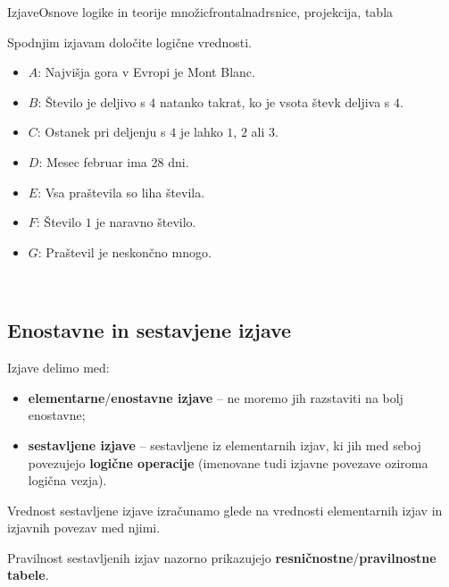 \begin{priprava}{1}{}{Izjave}{Osnove logike in teorije množic}{frontalna}{drsnice, projekcija, tabla}
 \begin{naloga}
    Spodnjim izjavam določite logične vrednosti.
    \begin{itemize}   
        \item $A$: Najvišja gora v Evropi je Mont Blanc.
        \item $B$: Število je deljivo s $4$ natanko takrat, ko je vsota števk deljiva s $4$.
        \item $C$: Ostanek pri deljenju s $4$ je lahko $1$, $2$ ali $3$.
        \item $D$: Mesec februar ima 28 dni.
        \item $E$: Vsa praštevila so liha števila.
        \item $F$: Število $1$ je naravno število.
        \item $G$: Praštevil je neskončno mnogo.
    \end{itemize}
\end{naloga}

~


  \subsection{Enostavne in sestavjene izjave}
    
    Izjave delimo med:
    \begin{itemize}
        \item \textbf{elementarne}/\textbf{enostavne izjave} -- ne moremo 
            jih razstaviti na bolj enostavne;
        \item \textbf{sestavljene izjave} -- sestavljene iz elementarnih izjav, 
            ki jih med seboj povezujejo \textbf{logične operacije} (imenovane 
            tudi izjavne povezave oziroma~ logična vezja).
    \end{itemize}
 

   
    Vrednost sestavljene izjave izračunamo glede na vrednosti elementarnih 
    izjav in izjavnih povezav med njimi.
 
   
    Pravilnost sestavljenih izjav nazorno prikazujejo 
    \textbf{resničnostne}/\textbf{pravilnostne tabele}.
 


\end{priprava}